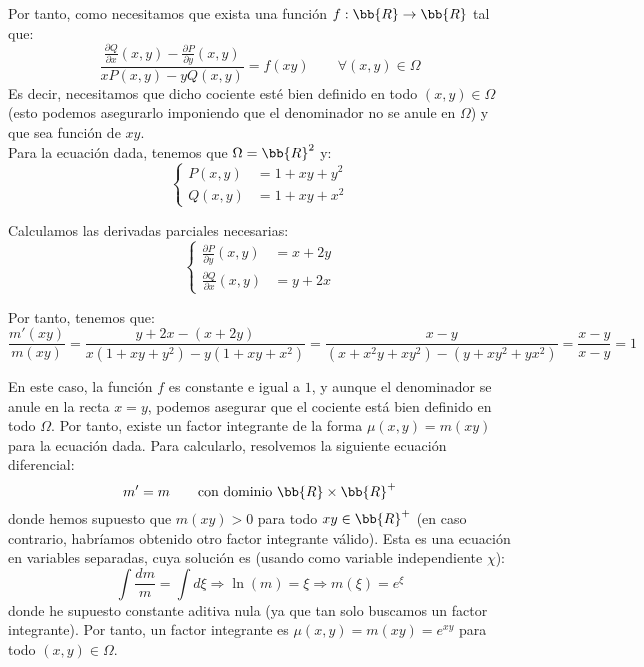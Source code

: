 \begin{ejercicio}
    Por tanto, como necesitamos que exista una función $f:\bb{R}\to\bb{R}$ tal que:
    \begin{equation*}
        \dfrac{\frac{\partial Q}{\partial x}(x,y)-\frac{\partial P}{\partial y}(x,y)}{xP(x,y)-yQ(x,y)} = f(xy)\qquad \forall (x,y)\in\Omega
    \end{equation*}
    Es decir, necesitamos que dicho cociente esté bien definido en todo $(x,y)\in\Omega$ (esto podemos asegurarlo imponiendo que el denominador no se anule en $\Omega$) y que sea función de $xy$.\\

    Para la ecuación dada, tenemos que $\Omega=\bb{R}^2$ y:
    \begin{equation*}
        \left\{
            \begin{aligned}
                P(x,y) &= 1+xy+y^2\\
                Q(x,y) &= 1+xy+x^2
            \end{aligned}
        \right.
    \end{equation*}

    Calculamos las derivadas parciales necesarias:
    \begin{equation*}
        \left\{
            \begin{aligned}
                \frac{\partial P}{\partial y}(x,y) &= x+2y\\
                \frac{\partial Q}{\partial x}(x,y) &= y+2x
            \end{aligned}
        \right.
    \end{equation*}

    Por tanto, tenemos que:
    \begin{equation*}
        \dfrac{m'(xy)}{m(xy)} = \dfrac{y+2x-(x+2y)}{x(1+xy+y^2)-y(1+xy+x^2)} = \dfrac{x-y}{(x+x^2y+xy^2)-(y+xy^2+yx^2)} = \dfrac{x-y}{x-y} = 1
    \end{equation*}

    En este caso, la función $f$ es constante e igual a $1$, y aunque el denominador se anule en la recta $x=y$, podemos asegurar que el cociente está bien definido en todo $\Omega$. Por tanto, existe un factor integrante de la forma $\mu(x,y)=m(xy)$ para la ecuación dada. Para calcularlo, resolvemos la siguiente ecuación diferencial:
    \begin{equation*}
        m'=m \qquad \text{con dominio }\bb{R}\times \bb{R}^+
    \end{equation*}
    donde hemos supuesto que $m(xy)>0$ para todo $xy\in\bb{R}^+$ (en caso contrario, habríamos obtenido otro factor integrante válido). Esta es una ecuación en variables separadas, cuya solución es (usando como variable independiente $\chi$):
    \begin{equation*}
        \int \frac{dm}{m} = \int d\xi 
        \Longrightarrow \ln (m) = \xi
        \Longrightarrow m(\xi) = e^{\xi}
    \end{equation*}
    donde he supuesto constante aditiva nula (ya que tan solo buscamos un factor integrante). Por tanto, un factor integrante es $\mu(x,y)=m(xy)=e^{xy}$ para todo $(x,y)\in\Omega$.\\


\end{ejercicio}
